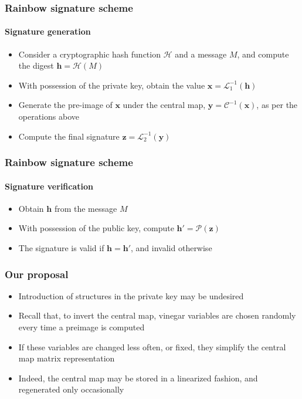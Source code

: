 \documentclass[12pt]{beamer}
\begin{document}
\begin{frame}
\begin{itemize}
\begin{figure}
    \end{figure}
  \end{itemize}
\end{frame}

\begin{frame}
  \frametitle{Rainbow signature scheme}
  \framesubtitle{Signature generation}
  \begin{itemize}
    \item Consider a cryptographic hash function $\mathcal{H}$ and a message
        $M$, and compute the digest $\mathbf{h} = \mathcal{H}(M)$
    \item With possession of the private key, obtain the value
        $\mathbf{x} = \mathcal{L}_{1}^{-1}(\mathbf{h})$
    \item Generate the pre-image of $\mathbf{x}$ under the central map,
        $\mathbf{y} = \mathcal{C}^{-1}(\mathbf{x})$, as per the operations
          above
    \item Compute the final signature
        $\mathbf{z} = \mathcal{L}_{2}^{-1}(\mathbf{y})$
  \end{itemize}
\end{frame}

\begin{frame}
  \frametitle{Rainbow signature scheme}
  \framesubtitle{Signature verification}
  \begin{itemize}
    \item Obtain $\mathbf{h}$ from the message $M$
    \item With possession of the public key, compute
        $\mathbf{h}' = \mathcal{P}(\mathbf{z})$
    \item The signature is valid if $\mathbf{h} = \mathbf{h}'$, and invalid
        otherwise
  \end{itemize}
\end{frame}

\begin{frame}
  \frametitle{Our proposal}
  \begin{itemize}
    \item Introduction of structures in the private key may be undesired
    \item Recall that, to invert the central map, vinegar variables are
        chosen randomly every time a preimage is computed
    \item If these variables are changed less often, or fixed, they simplify
        the central map matrix representation
    \item Indeed, the central map may be stored in a linearized fashion, and
        regenerated only occasionally
  \end{itemize}
\end{frame}
\end{document}
